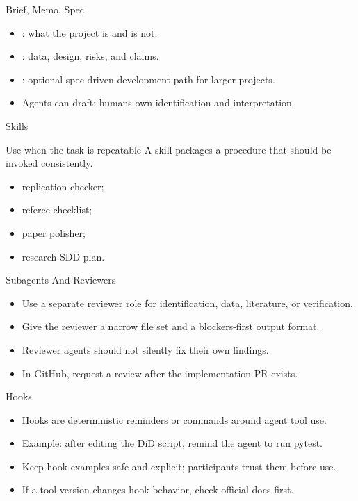 \begin{frame}{Brief, Memo, Spec}
  \begin{itemize}
    \item {}: what the project is and is not.
    \item {}: data, design, risks, and claims.
    \item {}: optional spec-driven development path for larger projects.
    \item Agents can draft; humans own identification and interpretation.
  \end{itemize}
\end{frame}

\begin{frame}{Skills}
  \begin{block}{Use when the task is repeatable}
    A skill packages a procedure that should be invoked consistently.
  \end{block}
  \begin{itemize}
    \item replication checker;
    \item referee checklist;
    \item paper polisher;
    \item research SDD plan.
  \end{itemize}
\end{frame}

\begin{frame}{Subagents And Reviewers}
  \begin{itemize}
    \item Use a separate reviewer role for identification, data, literature, or verification.
    \item Give the reviewer a narrow file set and a blockers-first output format.
    \item Reviewer agents should not silently fix their own findings.
    \item In GitHub, request a review after the implementation PR exists.
  \end{itemize}
\end{frame}

\begin{frame}{Hooks}
  \begin{itemize}
    \item Hooks are deterministic reminders or commands around agent tool use.
    \item Example: after editing the DiD script, remind the agent to run pytest.
    \item Keep hook examples safe and explicit; participants trust them before use.
    \item If a tool version changes hook behavior, check official docs first.
  \end{itemize}
\end{frame}

